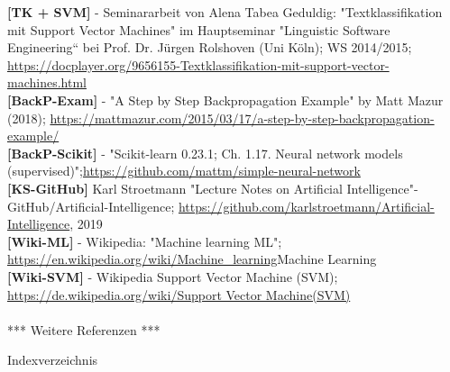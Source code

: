 \documentclass[12pt]{article}
\begin{document}
%
\textbf{[TK + SVM]} - Seminararbeit von Alena Tabea Geduldig: "Textklassifikation mit Support Vector Machines" im  Hauptseminar "Linguistic Software Engineering“ bei Prof. Dr. Jürgen Rolshoven (Uni Köln); WS 2014/2015; \url{https://docplayer.org/9656155-Textklassifikation-mit-support-vector-machines.html}\\[0.2cm] 
%
\textbf{[BackP-Exam]} - "A Step by Step Backpropagation Example" by Matt Mazur (2018); \url{https://mattmazur.com/2015/03/17/a-step-by-step-backpropagation-example/}\\[0.2cm] 
%
\textbf{[BackP-Scikit]} - "Scikit-learn 0.23.1; Ch. 1.17. Neural network models (supervised)";\url{https://github.com/mattm/simple-neural-network}\\[0.2cm] 
%
\textbf{[KS-GitHub]} Karl Stroetmann "Lecture Notes on Artificial Intelligence"-  GitHub/Artificial-Intelligence; \url{https://github.com/karlstroetmann/Artificial-Intelligence}, 2019\\[0.2cm]  
%
\textbf{[Wiki-ML]} - Wikipedia: "Machine learning ML"; \url{https://en.wikipedia.org/wiki/Machine_learning}{Machine Learning}\\[0.2cm] 
%
\textbf{[Wiki-SVM]} - Wikipedia Support Vector Machine (SVM); \url{https://de.wikipedia.org/wiki/Support Vector Machine(SVM)} \\[0.2cm] \\[0.2cm]

*** Weitere Referenzen ***\\

\newpage

\begin{LARGE} Indexverzeichnis \end{LARGE}

\clearpage %

\printindex
\end{document}
